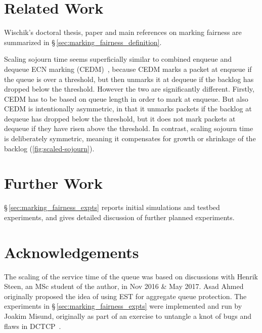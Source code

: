 \section{Related Work}\label{sec:related}

Wischik's doctoral thesis, paper and main references on marking fairness are summarized in \S\,\ref{sec:marking_fairness_definition}.

Scaling sojourn time seems superficially similar to combined enqueue and dequeue ECN marking (CEDM)~\cite{Shan17:CEDM}, because CEDM marks a packet at enqueue if the queue is over a threshold, but then unmarks it at dequeue if the backlog has dropped below the threshold. However the two are significantly different. Firstly, CEDM has to be based on queue length in order to mark at enqueue. But also CEDM is intentionally asymmetric, in that it unmarks packets if the backlog at dequeue has dropped below the threshold, but it does not mark packets at dequeue if they have risen above the threshold. In contrast, scaling sojourn time is deliberately symmetric, meaning it compensates for growth or shrinkage of the backlog (\autoref{fig:scaled-sojourn}).

\section{Further Work}

%
\S\,\ref{sec:marking_fairness_expts} reports initial simulations and testbed experiments, and gives detailed discussion of further planned experiments.

\section{Acknowledgements}\label{sigqdyntr_acks}

The scaling of the service time of the queue was based on discussions with Henrik Steen, an MSc student of the author, in Nov 2016 \& May 2017. Asad Ahmed originally proposed the idea of using EST for aggregate queue protection. The experiments in \S\,\ref{sec:marking_fairness_expts} were implemented and run by Joakim Misund, originally as part of an exercise to untangle a knot of bugs and flaws in DCTCP~\cite{Misund22a:DCTCP_bug-knot}.
